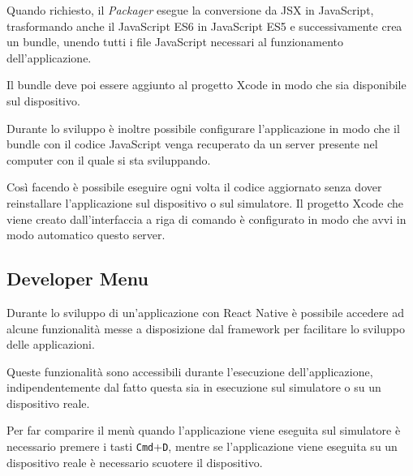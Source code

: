 Quando richiesto, il \textit{Packager} esegue la conversione da JSX in JavaScript, trasformando anche il JavaScript ES6 in JavaScript ES5 e successivamente crea un bundle, unendo tutti i file JavaScript necessari al funzionamento dell'applicazione.

Il bundle deve poi essere aggiunto al progetto Xcode in modo che sia disponibile sul dispositivo.

Durante lo sviluppo è inoltre possibile configurare l'applicazione in modo che il bundle con il codice JavaScript venga recuperato da un server presente nel computer con il quale si sta sviluppando.

Così facendo è possibile eseguire ogni volta il codice aggiornato senza dover reinstallare l'applicazione sul dispositivo o sul simulatore.
Il progetto Xcode che viene creato dall'interfaccia a riga di comando è configurato in modo che avvi in modo automatico questo server.

\subsection{Developer Menu}

Durante lo sviluppo di un'applicazione con React Native è possibile accedere ad alcune funzionalità messe a disposizione dal framework per facilitare lo sviluppo delle applicazioni.

Queste funzionalità sono accessibili durante l'esecuzione dell'applicazione, indipendentemente dal fatto questa sia in esecuzione sul simulatore o su un dispositivo reale.

Per far comparire il menù quando l'applicazione viene eseguita sul simulatore è necessario premere i tasti \texttt{Cmd}+\texttt{D}, mentre se l'applicazione viene eseguita su un dispositivo reale è necessario scuotere il dispositivo.

